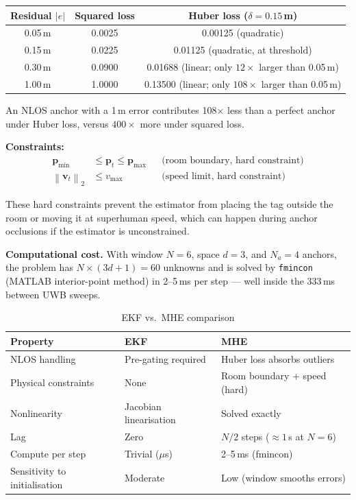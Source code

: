 \documentclass[11pt,a4paper]{article}
\newcommand{\vect}[1]{\bm{#1}}
\newcommand{\norm}[1]{\left\|#1\right\|}
\begin{document}
\begin{center}
\begin{tabular}{ccc}
\toprule
\textbf{Residual $|e|$} & \textbf{Squared loss} & \textbf{Huber loss ($\delta=0.15$\,m)} \\
\midrule
0.05\,m & 0.0025 & 0.00125 (quadratic) \\
0.15\,m & 0.0225 & 0.01125 (quadratic, at threshold) \\
0.30\,m & 0.0900 & 0.01688 (linear; only $12\times$ larger than 0.05\,m) \\
1.00\,m & 1.0000 & 0.13500 (linear; only $108\times$ larger than 0.05\,m) \\
\bottomrule
\end{tabular}
\end{center}

An NLOS anchor with a 1\,m error contributes 108$\times$ less than a perfect anchor under Huber loss, versus $400\times$ more under squared loss.

\textbf{Constraints:}
\begin{align}
\vect{p}_\text{min} &\leq \vect{p}_t \leq \vect{p}_\text{max} && \text{(room boundary, hard constraint)} \label{eq:bound}\\
\norm{\vect{v}_t}_2 &\leq v_\text{max} && \text{(speed limit, hard constraint)} \label{eq:speed}
\end{align}

These hard constraints prevent the estimator from placing the tag outside the room or moving it at superhuman speed, which can happen during anchor occlusions if the estimator is unconstrained.

\textbf{Computational cost.} With window $N=6$, space $d=3$, and $N_a=4$ anchors, the problem has $N\times(3d+1)=60$ unknowns and is solved by \texttt{fmincon} (MATLAB interior-point method) in 2--5\,ms per step --- well inside the 333\,ms between UWB sweeps.

\begin{table}[ht]
\centering
\caption{EKF vs.\ MHE comparison}
\begin{tabular}{lll}
\toprule
\textbf{Property} & \textbf{EKF} & \textbf{MHE} \\
\midrule
NLOS handling & Pre-gating required & Huber loss absorbs outliers \\
Physical constraints & None & Room boundary + speed (hard) \\
Nonlinearity & Jacobian linearisation & Solved exactly \\
Lag & Zero & $N/2$ steps ($\approx 1$\,s at $N=6$) \\
Compute per step & Trivial ($\mu$s) & 2--5\,ms (fmincon) \\
Sensitivity to initialisation & Moderate & Low (window smooths errors) \\
\bottomrule
\end{tabular}
\end{table}
\end{document}
